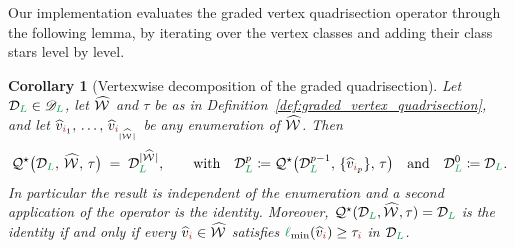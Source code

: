 \documentclass[a4paper, 12pt]{article}
\makeatletter
\newcommand{\quadriV}{\mathcal{Q}^{\star}}                       %
\newcommand{\quadriVup}[1]{\quadriV_{\rightarrow #1}}            %
\newcommand{\lmin}{\l_{\min}}
\newcommand{\targetlevel}{\tau}                                 %
\newcommand{\green}{\color{ForestGreen}}
\newcommand{\brickred}{\color{BrickRed}}
\newcommand{\vertexClass}[1]{\widehat{v}_{#1}}
\DeclareRobustCommand{\markedVertexClasses}[1][]{\widehat{\mathcal{W}}\ifx\@empty#1\@empty\else^{#1}\fi}
\newcommand{\coarseIdxone}{{\brickred i}}
\renewcommand{\l}{{\green\ell}}
\renewcommand{\L}{{\green L}}
\newtheorem{corollary}[theorem]{Corollary}
\theoremstyle{definition}
\theoremstyle{plain}
\numberwithin{equation}{section}
\newcommand{\tobecut}[1]{{\color{red} #1}}     %
\DeclareRobustCommand{\domseq}[1][]{\mathcal{D}\ifx\@empty#1\@empty\else_{#1}\fi}
\newcommand{\alldomseqs}{\mathscr{D}}
\makeatother
\begin{document}
Our implementation evaluates the graded vertex quadrisection operator through the following lemma, by iterating over the vertex classes and adding their class stars level by level.

\begin{corollary}[Vertexwise decomposition of the graded quadrisection]
    \label{cor:graded_quadrisection_composition}
    Let $\domseq[\L] \in \alldomseqs_\L$, let $\markedVertexClasses$ and $\targetlevel$ be as in Definition~\ref{def:graded_vertex_quadrisection}, and let $\vertexClass{\coarseIdxone_1}, \, \dots, \, \vertexClass{\coarseIdxone_{\vert \markedVertexClasses \vert}}$ be any enumeration of $\markedVertexClasses$. Then
    \begin{equation}
        \label{eq:graded_quadrisection_composition}
        \quadriV \big( \domseq[\L], \, \markedVertexClasses, \, \targetlevel \big) \; = \; \domseq[\L]^{\vert \markedVertexClasses \vert}, \qquad \text{with} \quad \domseq[\L]^{p} \coloneq \quadriV \big( \domseq[\L]^{p-1}, \, \{ \vertexClass{\coarseIdxone_p} \}, \, \targetlevel \big) \quad \text{and} \quad  \domseq[\L]^{0} \coloneq \domseq[\L].
    \end{equation}
    In particular the result is independent of the enumeration and a second application of the operator is the identity. Moreover, $\quadriV(\domseq[\L], \markedVertexClasses, \targetlevel) = \domseq[\L]$ is the identity if and only if every $\vertexClass{\coarseIdxone} \in \markedVertexClasses$ satisfies $\lmin(\vertexClass{\coarseIdxone}) \geq \targetlevel_\coarseIdxone$ in $\domseq[\L]$.
\end{corollary}
\end{document}
